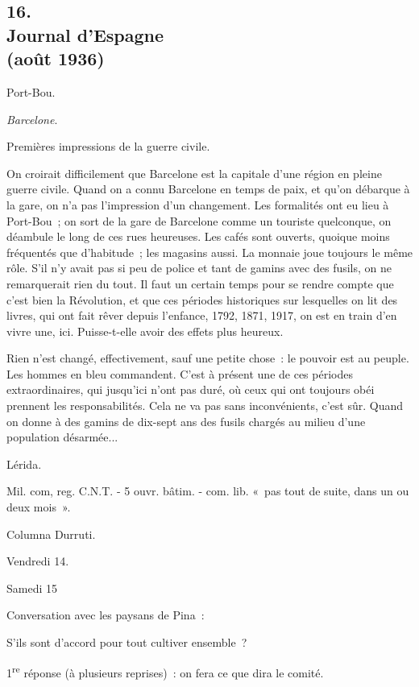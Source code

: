\documentclass[french,twoside]{book} %
\begin{document}
\subsection[{16. Journal d’Espagne, (août 1936)}]{16. \\
Journal d’Espagne \\
(août 1936)}
\noindent \par
Port-Bou.\par
{\itshape Barcelone}.\par
Premières impressions de la guerre civile.\par
On croirait difficilement que Barcelone est la capitale d'une région en pleine guerre civile. Quand on a connu Barcelone en temps de paix, et qu'on débarque à la gare, on n'a pas l'impression d'un changement. Les formalités ont eu lieu à Port-Bou ; on sort de la gare de Barcelone comme un touriste quelconque, on déambule le long de ces rues heureuses. Les cafés sont ouverts, quoique moins fréquentés que d'habitude ; les magasins aussi. La monnaie joue toujours le même rôle. S'il n'y avait pas si peu de police et tant de gamins avec des fusils, on ne remarquerait rien du tout. Il faut un certain temps pour se rendre compte que c'est bien la Révolution, et que ces périodes historiques sur lesquelles on lit des livres, qui ont fait rêver depuis l'enfance, 1792, 1871, 1917, on est en train d'en vivre une, ici. Puisse-t-elle avoir des effets plus heureux.\par
Rien n'est changé, effectivement, sauf une petite chose : le pouvoir est au peuple. Les hommes en bleu commandent. C'est à présent une de ces périodes extraordinaires, qui jusqu'ici n'ont pas duré, où ceux qui ont toujours obéi prennent les responsabilités. Cela ne va pas sans inconvénients, c'est sûr. Quand on donne à des gamins de dix-sept ans des fusils chargés au milieu d'une population désarmée...\par
Lérida.\par
Mil. com, reg. C.N.T. - 5 ouvr. bâtim. - com. lib. « pas tout de suite, dans un ou deux mois ».\par
Columna Durruti.\par
Vendredi 14.\par
Samedi 15\par
Conversation avec les paysans de Pina :\par
S'ils sont d'accord pour tout cultiver ensemble ?\par
1\textsuperscript{re} réponse (à plusieurs reprises) : on fera ce que dira le comité.\par
\end{document}
